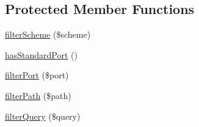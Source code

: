 \subsection*{Protected Member Functions}
\begin{DoxyCompactItemize}
\item 
\mbox{\hyperlink{class_pes_1_1_http_1_1_uri_a6dab56e5fe183d3b40694e8dc19c5650}{filter\+Scheme}} (\$scheme)
\item 
\mbox{\hyperlink{class_pes_1_1_http_1_1_uri_a05b11cf88dd4ccc6e1f7be3026656eb6}{has\+Standard\+Port}} ()
\item 
\mbox{\hyperlink{class_pes_1_1_http_1_1_uri_ac1054b8b406d0a90bb8179cf083ec7b6}{filter\+Port}} (\$port)
\item 
\mbox{\hyperlink{class_pes_1_1_http_1_1_uri_a8568e8e83e03e368b21b85bd148c0cdd}{filter\+Path}} (\$path)
\item 
\mbox{\hyperlink{class_pes_1_1_http_1_1_uri_a4d6f71007ff6abcfc7c54b16dd4f4162}{filter\+Query}} (\$query)
\end{DoxyCompactItemize}
